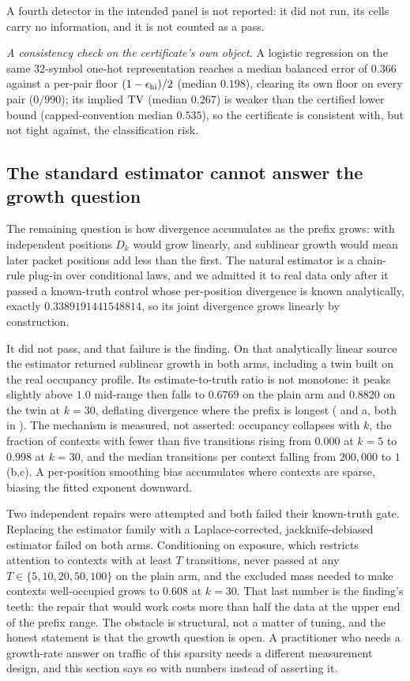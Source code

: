  A fourth detector in the intended panel is not
reported: it did not run, its cells carry no information, and it is not counted
as a pass.

\emph{A consistency check on the certificate's own object.} A logistic
regression on the same $32$-symbol one-hot representation reaches a median
balanced error of $0.366$ against a per-pair floor $(1-\epsilon_{\mathrm{hi}})/2$ (median
$0.198$), clearing its own floor on every pair ($0/990$); its implied $\mathrm{TV}$
(median $0.267$) is weaker than the certified lower bound (capped-convention
median $0.535$), so
the certificate is consistent with, but not tight against, the classification
risk.

\subsection{The standard estimator cannot answer the growth question}
\label{sec:results/estimator}

The remaining question is how divergence accumulates as the prefix grows: with
independent positions $D_k$ would grow linearly, and sublinear growth would mean
later packet positions add less than the first. The natural estimator is a
chain-rule plug-in over conditional laws, and we admitted it to real data only
after it passed a known-truth control whose per-position divergence is known
analytically, exactly $0.3389191441548814$, so its joint divergence grows
linearly by construction.

It did not pass, and that failure is the finding. On that analytically linear
source the estimator returned sublinear growth in both arms, including a twin
built on the real occupancy profile. Its estimate-to-truth ratio is not monotone:
it peaks slightly above $1.0$ mid-range then falls to $0.6769$ on the plain arm
and $0.8820$ on the twin at $k{=}30$, deflating divergence where the prefix is
longest ( and a, both in ). The mechanism is
measured, not asserted: occupancy collapses with $k$, the fraction of contexts
with fewer than five transitions rising from $0.000$ at $k{=}5$ to $0.998$ at
$k{=}30$, and the median transitions per context falling from $200{,}000$ to $1$
(b,c). A per-position smoothing bias accumulates where
contexts are sparse, biasing the fitted exponent downward.

Two independent repairs were attempted and both failed their known-truth gate.
Replacing the estimator family with a Laplace-corrected, jackknife-debiased
estimator failed on both arms. Conditioning on exposure, which restricts
attention to contexts with at least $T$ transitions, never passed at any
$T \in \{5,10,20,50,100\}$ on the plain arm, and the excluded mass needed to make
contexts well-occupied grows to $0.608$ at $k{=}30$. That last number is the
finding's teeth: the repair that would work costs more than half the data at
the upper end of the prefix range. The obstacle is structural, not a matter of
tuning, and the honest statement is that the growth question is open. A
practitioner who needs a growth-rate answer on traffic of this sparsity needs a
different measurement design, and this section says so with numbers instead of
asserting it.

